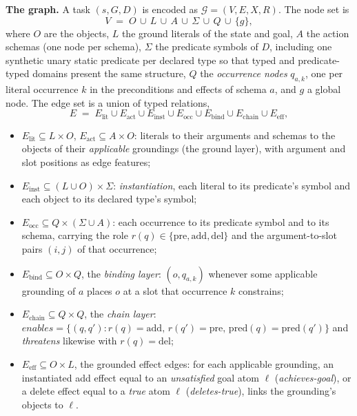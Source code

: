 \documentclass{article} %
\begin{document}
\textbf{The graph.} A task $(s, G, D)$ is encoded as
$\mathcal{G} = (V, E, X, R)$. The node set is
\begin{equation*}
V \;=\; O \,\cup\, L \,\cup\, A \,\cup\, \Sigma \,\cup\, Q \,\cup\, \{g\},
\end{equation*}
where $O$ are the objects, $L$ the ground literals of the state and goal,
$A$ the action schemas (one node per schema), $\Sigma$ the
predicate symbols of $D$, including one synthetic unary static predicate
per declared type so that typed and predicate-typed domains present the
same structure, $Q$ the \emph{occurrence nodes} $q_{a,k}$, one per
literal occurrence $k$ in the preconditions and effects of schema $a$, and
$g$ a global node. The edge set is a union of typed relations,
\begin{equation*}
E \;=\; E_{\mathrm{lit}} \cup E_{\mathrm{act}} \cup E_{\mathrm{inst}} \cup
E_{\mathrm{occ}} \cup E_{\mathrm{bind}} \cup E_{\mathrm{chain}} \cup
E_{\mathrm{eff}},
\end{equation*}
\begin{itemize}
\item $E_{\mathrm{lit}} \subseteq L \times O$, $E_{\mathrm{act}} \subseteq
  A \times O$: literals to their arguments and schemas to the objects of
  their \emph{applicable} groundings (the ground layer), with argument
  and slot positions as edge features;
\item $E_{\mathrm{inst}} \subseteq (L \cup O) \times \Sigma$:
  \emph{instantiation}, each literal to its predicate's symbol and each
  object to its declared type's symbol;
\item $E_{\mathrm{occ}} \subseteq Q \times (\Sigma \cup A)$: each occurrence
  to its predicate symbol and to its schema, carrying the role
  $r(q) \in \{\mathrm{pre}, \mathrm{add}, \mathrm{del}\}$ and the
  argument-to-slot pairs $(i, j)$ of that occurrence;
\item $E_{\mathrm{bind}} \subseteq O \times Q$, the \emph{binding layer}:
  $(o, q_{a,k})$ whenever some applicable grounding of $a$ places $o$ at a
  slot that occurrence $k$ constrains;
\item $E_{\mathrm{chain}} \subseteq Q \times Q$, the \emph{chain layer}:
  $\textit{enables} = \{(q, q') : r(q) = \mathrm{add},\, r(q') =
  \mathrm{pre},\, \mathrm{pred}(q) = \mathrm{pred}(q')\}$ and
  \textit{threatens} likewise with $r(q) = \mathrm{del}$;
\item $E_{\mathrm{eff}} \subseteq O \times L$, the grounded effect edges: for
  each applicable grounding, an instantiated add effect equal to an
  \emph{unsatisfied} goal atom $\ell$ (\textit{achieves-goal}), or a delete
  effect equal to a \emph{true} atom $\ell$ (\textit{deletes-true}), links
  the grounding's objects to $\ell$.
\end{itemize}
\end{document}
